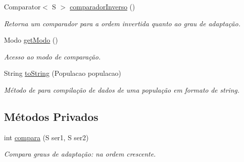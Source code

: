 \begin{DoxyCompactItemize}
Comparator$<$ S $>$ \hyperlink{classic_1_1populacional_1_1_ambiente_3_01_g_01extends_01_number_01_6_comparable_3_01_g_01_4_00_01a5eb548f12ccc7dbff4cf5c498ddc51_a90bc2c36b5d705af35821fb38438021e}{comparador\-Inverso} ()
\begin{DoxyCompactList}\small\item\em Retorna um comparador para a ordem invertida quanto ao grau de adaptação. \end{DoxyCompactList}\item 
Modo \hyperlink{classic_1_1populacional_1_1_ambiente_3_01_g_01extends_01_number_01_6_comparable_3_01_g_01_4_00_01a5eb548f12ccc7dbff4cf5c498ddc51_afeaac1bdf13bcc0e889c5241143a438a}{get\-Modo} ()
\begin{DoxyCompactList}\small\item\em Acesso ao modo de comparação. \end{DoxyCompactList}\item 
String \hyperlink{classic_1_1populacional_1_1_ambiente_3_01_g_01extends_01_number_01_6_comparable_3_01_g_01_4_00_01a5eb548f12ccc7dbff4cf5c498ddc51_a1ddc18e33c1028fbbb605a72c3ad09f9}{to\-String} (Populacao populacao)
\begin{DoxyCompactList}\small\item\em Método de para compilação de dados de uma população em formato de string. \end{DoxyCompactList}\end{DoxyCompactItemize}
\subsection*{Métodos Privados}
\begin{DoxyCompactItemize}
\item 
int \hyperlink{classic_1_1populacional_1_1_ambiente_3_01_g_01extends_01_number_01_6_comparable_3_01_g_01_4_00_01a5eb548f12ccc7dbff4cf5c498ddc51_a9a4b847a280696edb0b9c44d2842392f}{compara} (S ser1, S ser2)
\begin{DoxyCompactList}\small\item\em Compara graus de adaptação\-: na ordem crescente. \end{DoxyCompactList}\end{DoxyCompactItemize}
